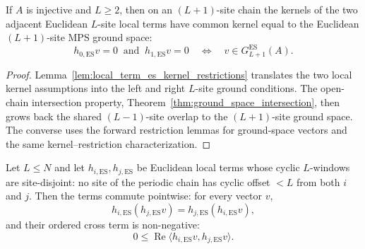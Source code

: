 \begin{theorem}
    \label{thm:adjacent_local_kernels_ground_space_es}
    \leanok
    If $A$ is injective and $L\ge2$, then on an $(L+1)$-site chain the kernels of
    the two adjacent Euclidean $L$-site local terms have common kernel equal to
    the Euclidean $(L+1)$-site MPS ground space:
    \[
        h_{0,\mathrm{ES}}v=0\ \text{ and }\ h_{1,\mathrm{ES}}v=0
        \quad\Longleftrightarrow\quad
        v\in G_{L+1}^{\mathrm{ES}}(A).
    \]
\end{theorem}

\begin{proof}
    \leanok
    Lemma~\ref{lem:local_term_es_kernel_restrictions} translates the two local
    kernel assumptions into the left and right $L$-site ground conditions. The
    open-chain intersection property, Theorem~\ref{thm:ground_space_intersection},
    then grows back the shared $(L-1)$-site overlap to the $(L+1)$-site ground space.
    The converse uses the forward restriction lemmas for ground-space vectors and
    the same kernel--restriction characterization.
\end{proof}

\begin{lemma}
    \label{lem:transported_es_nonoverlap_positive}
    \leanok
    Let $L\le N$ and let $h_{i,\mathrm{ES}},h_{j,\mathrm{ES}}$ be Euclidean local
    terms whose cyclic $L$-windows are site-disjoint: no site of the periodic chain
    has cyclic offset $<L$ from both $i$ and $j$. Then the terms commute pointwise:
    for every vector $v$,
    \[
        h_{i,\mathrm{ES}}(h_{j,\mathrm{ES}}v)
        = h_{j,\mathrm{ES}}(h_{i,\mathrm{ES}}v),
    \]
    and their ordered cross term is non-negative:
    \[
        0\le \operatorname{Re}\langle h_{i,\mathrm{ES}}v,
        h_{j,\mathrm{ES}}v\rangle.
    \]
\end{lemma}

